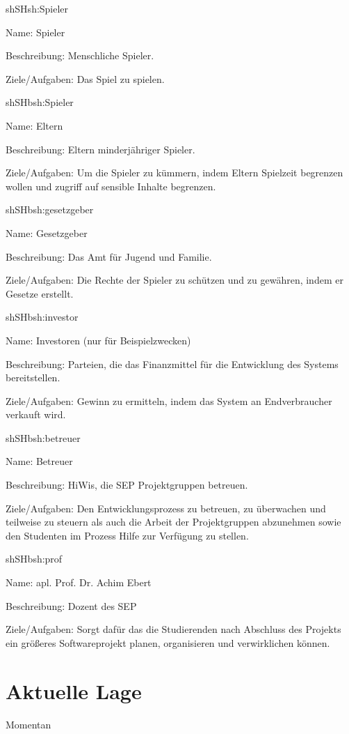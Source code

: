 \begin{description}[leftmargin=5em, style=sameline]
	
	\begin{lhp}{sh}{SH}{sh:Spieler}
		\item [Name:] Spieler
		\item [Beschreibung:] Menschliche Spieler.
		\item [Ziele/Aufgaben:] Das Spiel zu spielen.
	\end{lhp}
	
	\begin{lhp}{sh}{SH}{bsh:Spieler}
		\item [Name:] Eltern
		\item [Beschreibung:] Eltern minderjähriger Spieler.
		\item [Ziele/Aufgaben:] Um die Spieler zu kümmern, indem Eltern Spielzeit begrenzen wollen und zugriff auf sensible Inhalte begrenzen.
	\end{lhp}
	
	\begin{lhp}{sh}{SH}{bsh:gesetzgeber}
		\item [Name:] Gesetzgeber
		\item [Beschreibung:] Das Amt für Jugend und Familie.
		\item [Ziele/Aufgaben:] Die Rechte der Spieler zu schützen und zu gewähren, indem er Gesetze erstellt.
	\end{lhp}
	
	\begin{lhp}{sh}{SH}{bsh:investor}
		\item [Name:] Investoren (nur für Beispielzwecken)
		\item [Beschreibung:] Parteien, die das Finanzmittel für die Entwicklung des Systems bereitstellen.
		\item [Ziele/Aufgaben:] Gewinn zu ermitteln, indem das System an Endverbraucher verkauft wird.
	\end{lhp}
	
	\begin{lhp}{sh}{SH}{bsh:betreuer}
		\item [Name:] Betreuer
		\item [Beschreibung:] HiWis, die SEP Projektgruppen betreuen.
		\item [Ziele/Aufgaben:] Den Entwicklungsprozess zu betreuen, zu überwachen und teilweise zu steuern als auch die Arbeit der Projektgruppen abzunehmen sowie den Studenten im Prozess Hilfe zur Verfügung zu stellen. 
	\end{lhp}
	
	\begin{lhp}{sh}{SH}{bsh:prof}
		\item [Name:] apl. Prof. Dr. Achim Ebert
		\item [Beschreibung:] Dozent des SEP
		\item [Ziele/Aufgaben:] Sorgt dafür das die Studierenden nach Abschluss des Projekts ein größeres Softwareprojekt planen, organisieren und verwirklichen können.
	\end{lhp}
		
\end{description}

\section{Aktuelle Lage}

Momentan 